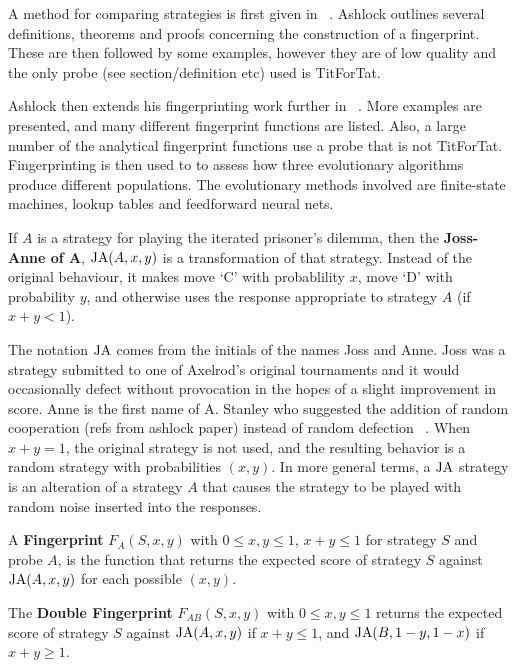 A method for comparing strategies is first given in ~\cite{Ashlock2004}.
Ashlock outlines several definitions, theorems and proofs concerning the construction of a fingerprint.
These are then followed by some examples, however they are of low quality and the only probe (see section/definition etc) used is TitForTat.

Ashlock then extends his fingerprinting work further in ~\cite{Ashlock2008}.
More examples are presented, and many different fingerprint functions are listed.
Also, a large number of the analytical fingerprint functions use a probe that is not TitForTat.
Fingerprinting is then used to to assess how three evolutionary algorithms produce different populations.
The evolutionary methods involved are finite-state machines, lookup tables and feedforward neural nets.


\begin{definition}\label{def:joss-ann}
If $A$ is a strategy for playing the iterated prisoner's dilemma, then the \textbf{Joss-Anne of A}, $\text{JA}(A, x, y)$ is a transformation of that strategy.
Instead of the original behaviour, it makes move `C' with probablility $x$, move `D' with probability $y$, and otherwise uses the response appropriate to strategy $A$ (if $x+y < 1$).
\end{definition}

The notation $\text{JA}$ comes from the initials of the names Joss and Anne.
Joss was a strategy submitted to one of Axelrod’s original tournaments and it would occasionally defect without provocation in the hopes of a slight improvement in score.
Anne is the first name of A. Stanley who suggested the addition of random cooperation (refs from ashlock paper) instead of random defection ~\cite{Ashlock2008}. %
When $x + y = 1$, the original strategy is not used, and the resulting behavior is a random strategy with probabilities $(x, y)$.
In more general terms, a $\text{JA}$ strategy is an alteration of a strategy $A$ that causes the strategy to be played with random noise inserted into the responses.

\begin{definition}\label{def:fingerprint}
A \textbf{Fingerprint} $F_A(S, x, y)$ with $0 \leq x, y \leq 1$, $x+y \leq 1$ for strategy $S$ and probe $A$, is the function that returns the expected score of strategy $S$ against $\text{JA}(A, x, y)$ for each possible $(x, y)$.
\end{definition}


\begin{definition}\label{def:double-fingerprint}
The \textbf{Double Fingerprint} $F_{AB}(S, x, y)$ with $0 \leq x, y \leq 1$ returns the expected score of strategy $S$ against $\text{JA}(A, x, y)$ if $x+y \leq 1$, and $\text{JA}(B, 1-y, 1-x)$ if $x+y \geq 1$.
\end{definition}


